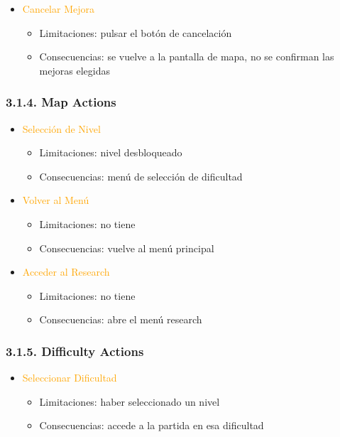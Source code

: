 \documentclass{article}
\begin{document}
\begin{itemize}
    \item \textcolor{Orange}{Cancelar Mejora}
    \begin{itemize}
        \item Limitaciones: pulsar el botón de cancelación
        \item Consecuencias: se vuelve a la pantalla de mapa, no se confirman las mejoras elegidas
    \end{itemize}
\end{itemize}

\subsubsection{3.1.4. Map Actions}

\begin{itemize}
    \item \textcolor{Orange}{Selección de Nivel}
    \begin{itemize}
        \item Limitaciones: nivel desbloqueado
        \item Consecuencias: menú de selección de dificultad
    \end{itemize}
    \item \textcolor{Orange}{Volver al Menú}
    \begin{itemize}
        \item Limitaciones: no tiene
        \item Consecuencias: vuelve al menú principal
    \end{itemize}
    \item \textcolor{Orange}{Acceder al Research}
    \begin{itemize}
        \item Limitaciones: no tiene
        \item Consecuencias: abre el menú research
    \end{itemize}
\end{itemize}

\subsubsection{3.1.5. Difficulty Actions}

\begin{itemize}
    \item \textcolor{Orange}{Seleccionar Dificultad}
    \begin{itemize}
        \item Limitaciones: haber seleccionado un nivel
        \item Consecuencias: accede a la partida en esa dificultad
    \end{itemize}
\end{itemize}
\end{document}
